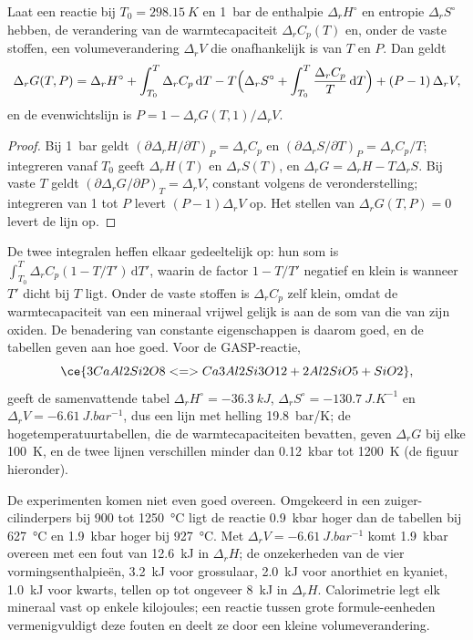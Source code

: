 \begin{theorem}\label{thm:b3:petrological-thermodynamics:dg}
Laat een reactie bij $T_0 = \qty{298.15}{K}$ en \qty{1}{bar} de enthalpie
$\Delta_rH^\circ$ en entropie $\Delta_rS^\circ$ hebben, de verandering van de
warmtecapaciteit $\Delta_rC_p(T)$ en, onder de vaste stoffen, een volumeverandering
$\Delta_rV$ die onafhankelijk is van $T$ en $P$. Dan geldt
\[
  \Delta_rG(T, P) = \Delta_rH^\circ + \int_{T_0}^{T}\Delta_rC_p\,\mathrm dT
  - T\Bigl(\Delta_rS^\circ + \int_{T_0}^{T}\frac{\Delta_rC_p}{T}\,\mathrm dT\Bigr)
  + (P - 1)\,\Delta_rV ,
\]
en de evenwichtslijn is $P = 1 - \Delta_rG(T, 1)/\Delta_rV$.
\end{theorem}

\begin{proof}
Bij \qty{1}{bar} geldt $(\partial\Delta_rH/\partial T)_P = \Delta_rC_p$ en
$(\partial\Delta_rS/\partial T)_P = \Delta_rC_p/T$; integreren vanaf $T_0$
geeft $\Delta_rH(T)$ en $\Delta_rS(T)$, en $\Delta_rG = \Delta_rH -
T\Delta_rS$. Bij vaste $T$ geldt $(\partial\Delta_rG/\partial P)_T = \Delta_rV$,
constant volgens de veronderstelling; integreren van 1 tot $P$ levert $(P - 1)\Delta_rV$ op.
Het stellen van $\Delta_rG(T, P) = 0$ levert de lijn op.
\end{proof}

De twee integralen heffen elkaar gedeeltelijk op: hun som is $\int_{T_0}^T\Delta_rC_p(1 -
T/T')\,\mathrm dT'$, waarin de factor $1 - T/T'$ negatief en klein is wanneer
$T'$ dicht bij $T$ ligt. Onder de vaste stoffen is $\Delta_rC_p$ zelf klein,
omdat de warmtecapaciteit van een mineraal vrijwel gelijk is aan de som van die van
zijn oxiden. De benadering van constante eigenschappen is daarom goed, en de
tabellen geven aan hoe goed. Voor de GASP-reactie,
\[
  \ce{3 CaAl2Si2O8 <=> Ca3Al2Si3O12 + 2 Al2SiO5 + SiO2},
\]
geeft de samenvattende tabel $\Delta_rH^\circ = \qty{-36.3}{kJ}$,
$\Delta_rS^\circ = \qty{-130.7}{J.K^{-1}}$ en $\Delta_rV =
\qty{-6.61}{J.bar^{-1}}$, dus een lijn met helling \qty{19.8}{bar/K}; de
hogetemperatuurtabellen, die de warmtecapaciteiten bevatten, geven
$\Delta_rG$ bij elke \qty{100}{K}, en de twee lijnen verschillen minder dan
\qty{0.12}{kbar} tot \qty{1200}{K} (de figuur hieronder).

De experimenten komen niet even goed overeen. Omgekeerd in een zuiger-cilinderpers bij
900 tot \qty{1250}{\celsius} ligt de reactie \qty{0.9}{kbar} hoger dan de
tabellen bij \qty{627}{\celsius} en \qty{1.9}{kbar} hoger bij
\qty{927}{\celsius}. Met $\Delta_rV = \qty{-6.61}{J.bar^{-1}}$ komt
\qty{1.9}{kbar} overeen met een fout van \qty{12.6}{kJ} in $\Delta_rH$; de
onzekerheden van de vier vormingsenthalpieën, \qty{3.2}{kJ} voor grossulaar,
\qty{2.0}{kJ} voor anorthiet en kyaniet, \qty{1.0}{kJ} voor kwarts, tellen op
tot ongeveer \qty{8}{kJ} in $\Delta_rH$. Calorimetrie legt elk mineraal vast op
enkele kilojoules; een reactie tussen grote formule-eenheden vermenigvuldigt deze
fouten en deelt ze door een kleine volumeverandering.

